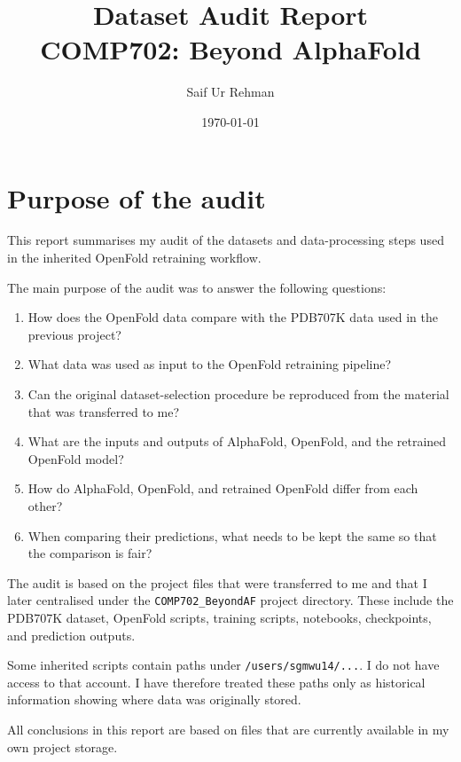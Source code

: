 \documentclass[11pt,a4paper]{article}
\title{\textbf{Dataset Audit Report}\\
COMP702: Beyond AlphaFold}
\author{Saif Ur Rehman}
\date{\today}
\begin{document}
\maketitle

\section{Purpose of the audit}

This report summarises my audit of the datasets and data-processing steps used in the inherited OpenFold retraining workflow.

The main purpose of the audit was to answer the following questions:

\begin{enumerate}[leftmargin=*]

    \item How does the OpenFold data compare with the PDB707K data used in the previous project?

    \item What data was used as input to the OpenFold retraining pipeline?

    \item Can the original dataset-selection procedure be reproduced from the material that was transferred to me?

    \item What are the inputs and outputs of AlphaFold, OpenFold, and the retrained OpenFold model?

    \item How do AlphaFold, OpenFold, and retrained OpenFold differ from each other?

    \item When comparing their predictions, what needs to be kept the same so that the comparison is fair?

\end{enumerate}

The audit is based on the project files that were transferred to me and that I later centralised under the \texttt{COMP702\_BeyondAF} project directory. These include the PDB707K dataset, OpenFold scripts, training scripts, notebooks, checkpoints, and prediction outputs.

Some inherited scripts contain paths under \texttt{/users/sgmwu14/...}. I do not have access to that account. I have therefore treated these paths only as historical information showing where data was originally stored.

All conclusions in this report are based on files that are currently available in my own project storage.
\end{document}
